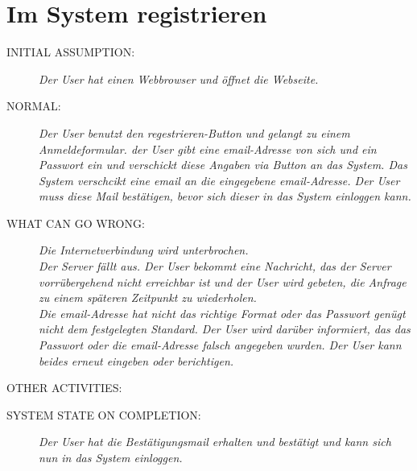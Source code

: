 \section{Im System registrieren}
\begin{description}
  \item [INITIAL ASSUMPTION:]
    \textit{Der \gls{User}  hat einen Webbrowser und öffnet die Webseite.}
  \item [NORMAL:]
    \textit{Der \gls{User} benutzt den regestrieren-Button und gelangt zu einem Anmeldeformular. der \gls{User} gibt eine email-Adresse von sich und ein Passwort ein und verschickt diese Angaben via Button an das System. Das System verschcikt eine email an die eingegebene email-Adresse. Der \gls{User} muss diese Mail bestätigen, bevor sich dieser in das System einloggen kann. }
  \item [WHAT CAN GO WRONG:]
    \textit{Die Internetverbindung wird unterbrochen.\\
Der Server fällt aus. Der \gls{User} bekommt eine Nachricht, das der Server vorrübergehend nicht erreichbar ist und der \gls{User} wird gebeten, die Anfrage zu einem späteren Zeitpunkt zu wiederholen.\\
Die email-Adresse hat nicht das richtige Format oder das Passwort genügt nicht dem festgelegten Standard. Der \gls{User} wird darüber informiert, das das Passwort oder die email-Adresse falsch angegeben wurden. Der \gls{User} kann beides erneut eingeben oder berichtigen.
}
  \item [OTHER ACTIVITIES:]
    \textit{}
  \item [SYSTEM STATE ON COMPLETION:]
    \textit{Der \gls{User} hat die Bestätigungsmail erhalten und bestätigt und kann sich nun in das System einloggen.}
\end{description}

